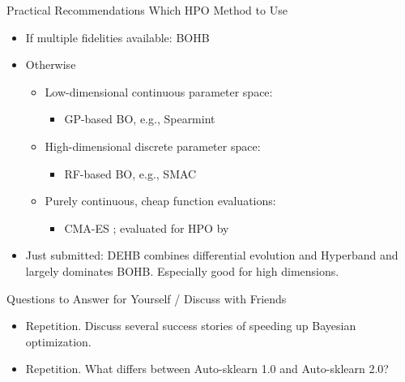 \begin{frame}[c]{Practical Recommendations Which HPO Method to Use }

\begin{itemize}
	\item If multiple fidelities available: BOHB 
\bigskip
	\item Otherwise
	\begin{itemize}
		\item Low-dimensional continuous parameter space: 
		\begin{itemize}
			\item GP-based BO, e.g., Spearmint 
		\end{itemize}
		\item High-dimensional discrete parameter space: 
		\begin{itemize}
			\item RF-based BO, e.g., SMAC 
		\end{itemize}
		\item Purely continuous, cheap function evaluations: 
		\begin{itemize}
			\item CMA-ES ;
			evaluated for HPO by 
		\end{itemize}
	\end{itemize}
	\bigskip
	\bigskip
	\pause
	\item Just submitted: \alert{DEHB} combines differential evolution and Hyperband and largely dominates BOHB. Especially good for high dimensions.
\end{itemize}

\end{frame}

\begin{frame}{Questions to Answer for Yourself / Discuss with Friends}

\begin{itemize}
    \item \alert{Repetition.} Discuss several success stories of speeding up Bayesian optimization.

    \item \alert{Repetition.} What differs between Auto-sklearn 1.0 and Auto-sklearn 2.0?
\end{itemize}

\end{frame}

